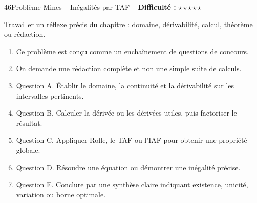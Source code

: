 \documentclass[11pt,a4paper]{article}
\newcommand{\etoiles}[1]{\textbf{Difficulté :} #1}
\begin{document}
\begin{exobox}{46}{Problème Mines -- Inégalités par TAF -- \etoiles{$\star\star\star\star\star$}}

\begin{objectifbox}
Travailler un réflexe précis du chapitre : domaine, dérivabilité, calcul, théorème ou rédaction.
\end{objectifbox}

\begin{enumerate}

\item Ce problème est conçu comme un enchaînement de questions de concours.

\item On demande une rédaction complète et non une simple suite de calculs.

\item Question A. Établir le domaine, la continuité et la dérivabilité sur les intervalles pertinents.

\item Question B. Calculer la dérivée ou les dérivées utiles, puis factoriser le résultat.

\item Question C. Appliquer Rolle, le TAF ou l'IAF pour obtenir une propriété globale.

\item Question D. Résoudre une équation ou démontrer une inégalité précise.

\item Question E. Conclure par une synthèse claire indiquant existence, unicité, variation ou borne optimale.

\end{enumerate}

\end{exobox}
\end{document}
